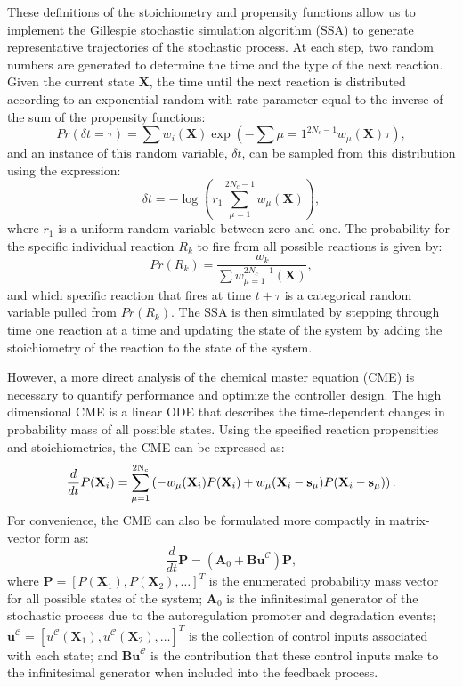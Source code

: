 \documentclass[12pt]{iopart}
\begin{document}
These definitions of the stoichiometry and propensity functions allow us to implement the Gillespie stochastic simulation algorithm (SSA) \cite{Gillespie1992, Gillespie1977} to generate representative trajectories of the stochastic process. At each step, two random numbers are generated to determine the time and the type of the next reaction. Given the current state $\mathbf{X}$, the time until the next reaction is distributed according to an exponential random with rate parameter equal to the inverse of the sum of the propensity functions:
\begin{equation}
Pr(\delta t = \tau) = \sum w_i(\mathbf{X}) \exp\left(- \sum{\mu=1}^{2N_c-1} w_\mu(\mathbf{X})\tau\right),
\end{equation}
and an instance of this random variable, $\delta t$,  can be sampled from this distribution using the expression:
\begin{equation}
\delta t = -\log\left(r_1 \sum_{\mu=1}^{2N_c-1}  w_\mu(\mathbf{X})\right),
\end{equation}
where $r_1$ is a uniform random variable between zero and one.
The probability for the specific individual reaction $R_k$ to fire from all possible reactions is given by:
\begin{equation}
Pr(R_k)=\frac{w_k}{\sum w_{\mu=1}^{2N_c-1} (\mathbf{X})},
\end{equation}
and which specific reaction that fires at time $t+\tau$ is a categorical random variable pulled from $Pr(R_k)$.  The SSA is then simulated by stepping through time one reaction at a time and updating the state of the system by adding the stoichiometry of the reaction to the state of the system.

However, a more direct analysis of the chemical master equation (CME) is necessary to quantify performance and optimize the controller design. The high dimensional CME is a linear ODE that describes the time-dependent changes in probability mass of all possible states. Using the specified reaction propensities and stoichiometries, the CME can be expressed as:
\begin{equation}
\frac{d}{dt}P(\mathbf{X}_i)=\sum_{\mu=1}^{2{\rm N_c}}
\left(
-w_{\mu}(\mathbf{X}_i)P(\mathbf{X}_i)
+w_{\mu}(\mathbf{X}_i-\mathbf{s}_{\mu})P(\mathbf{X}_i-\mathbf{s}_{\mu})
\right).\label{CMEindex}
\end{equation}
For convenience, the CME can also be formulated more compactly in matrix-vector form as:
\begin{equation}
\frac{d}{dt}\mathbf{P}=(\mathbf{A}_0+\textbf{Bu}^{\mathcal{C}})\mathbf{P},\label{CME}
\end{equation}
where $\mathbf{P} = [P(\mathbf{X}_1), P(\mathbf{X}_2), \ldots ]^T$ is the enumerated probability mass vector for all possible states of the system; $\mathbf{A}_0$ is the infinitesimal generator of the stochastic process due to the autoregulation promoter and degradation events;  $\textbf{u}^{\mathcal{C}} =[u^{\mathcal{C}}(\mathbf{X}_1), u^{\mathcal{C}}(\mathbf{X}_2), \ldots ]^T$ is the collection of control inputs associated with each state; and $\textbf{Bu}^{\mathcal{C}}$ is the contribution that these control inputs make to the infinitesimal generator when included into the feedback process. 
 
\end{document}
